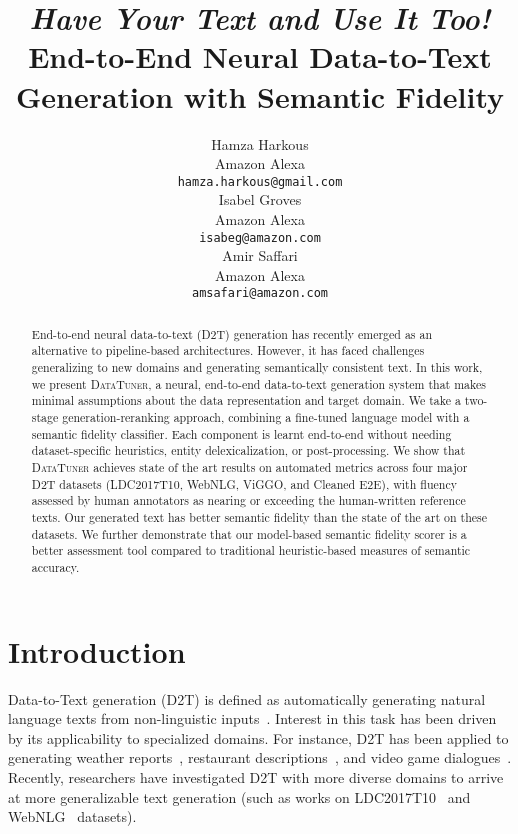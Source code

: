 \documentclass[11pt]{article}
\title{\textit{Have Your Text and Use It Too!}\\ End-to-End Neural Data-to-Text Generation with Semantic Fidelity}
\author{Hamza Harkous \\
  Amazon Alexa \\
  {\tt \small hamza.harkous@gmail.com} \\\And
  Isabel Groves \\
  Amazon Alexa \\
  {\tt \small  isabeg@amazon.com} \\ \And 
  Amir Saffari \\
  Amazon Alexa \\
  {\tt \small  amsafari@amazon.com} \\
  
  
  }
\date{}
\newcommand{\webnlg}{WebNLG\xspace}
\newcommand{\ldc}{LDC2017T10\xspace}
\newcommand{\viggo}{ViGGO\xspace}
\newcommand{\cleanedee}{Cleaned E2E\xspace}
\newcommand{\system}{\textsc{DataTuner}\xspace}
\theoremstyle{definition}
\theoremstyle{break}
\begin{document}
\maketitle



\begin{abstract}
End-to-end neural data-to-text (D2T) generation has recently emerged as an alternative to pipeline-based architectures. However, it has faced challenges generalizing to new domains and generating semantically consistent text.
In this work, we present \system, a neural, end-to-end data-to-text generation system that makes minimal assumptions about the data representation and target domain. We take a two-stage generation-reranking approach, combining a fine-tuned language model with a semantic fidelity classifier.
Each component is learnt end-to-end without needing dataset-specific heuristics, entity delexicalization, or post-processing. 
We show that \system achieves state of the art results on automated metrics across four major D2T datasets (\ldc, \webnlg, \viggo, and \cleanedee), with fluency assessed by human annotators as nearing or exceeding the human-written reference texts.
Our generated text has better semantic fidelity than the state of the art on these datasets.
We further demonstrate that our model-based semantic fidelity scorer is a better assessment tool compared to traditional heuristic-based measures of semantic accuracy. 
\end{abstract}


\section{Introduction}


Data-to-Text generation (D2T) is defined as automatically generating natural language texts from non-linguistic inputs~\cite{reiter2000building}. 
Interest in this task has been driven by its applicability to specialized domains. For instance, D2T has been applied to generating weather reports~\cite{liang-etal-2009-learning}, restaurant descriptions~\cite{novikova2017e2e}, and video game dialogues~\cite{juraska2019viggo}. Recently, researchers have investigated D2T with more diverse domains to arrive at more generalizable text generation (such as works on \ldc~\cite{knight2017abstract} and \webnlg~\cite{gardent2017creating} datasets).
\end{document}
